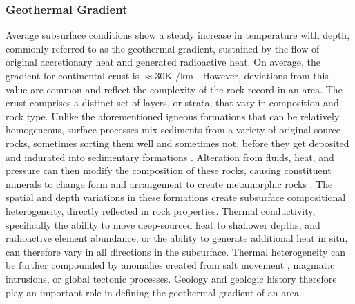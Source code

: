\subsubsection{Geothermal Gradient}\label{ch2:geotherm}
Average subsurface conditions show a steady increase in temperature with depth, commonly referred to as the geothermal gradient, sustained by the flow of original accretionary heat and generated radioactive heat. On average, the gradient for continental crust is $\approx30%
$K%
/km \citep[p.\ 209]{press_understanding_2004}. However, deviations from this value are common and reflect the complexity of the rock record in an area. The crust comprises a distinct set of layers, or strata, that vary in composition and rock type. Unlike the aforementioned igneous formations that can be relatively homogeneous, surface processes mix sediments from a variety of original source rocks, sometimes sorting them well and sometimes not, before they get deposited and indurated into sedimentary formations \citep[~p. 164-168]{press_understanding_2004}. Alteration from fluids, heat, and pressure can then modify the composition of these rocks, causing constituent minerals to change form and arrangement to create metamorphic rocks \citep[~p. 195-205]{press_understanding_2004}. The spatial and depth variations in these formations create subsurface compositional heterogeneity, directly reflected in rock properties. Thermal conductivity, specifically the ability to move deep-sourced heat to shallower depths, and radioactive element abundance, or the ability to generate additional heat in situ, can therefore vary in all directions in the subsurface. Thermal heterogeneity can be further compounded by anomalies created from salt movement \citep[~p. 164-168]{press_understanding_2004}, magmatic intrusions, or global tectonic processes. Geology and geologic history therefore play an important role in defining the geothermal gradient of an area.


